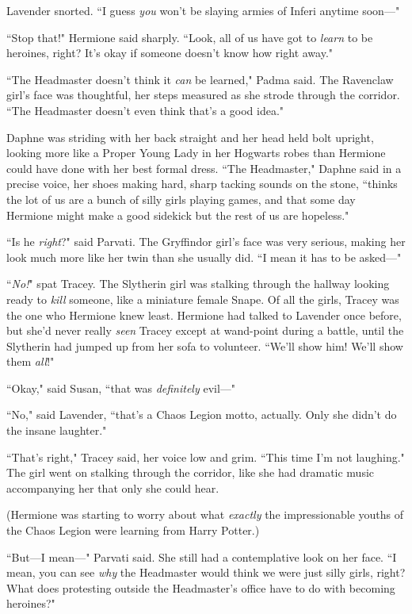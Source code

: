 Lavender snorted. ``I guess \emph{you} won't be slaying armies of Inferi anytime soon—"

``Stop that!" Hermione said sharply. ``Look, all of us have got to \emph{learn} to be heroines, right? It's okay if someone doesn't know how right away."

``The Headmaster doesn't think it \emph{can} be learned," Padma said. The Ravenclaw girl's face was thoughtful, her steps measured as she strode through the corridor. ``The Headmaster doesn't even think that's a good idea."

Daphne was striding with her back straight and her head held bolt upright, looking more like a Proper Young Lady in her Hogwarts robes than Hermione could have done with her best formal dress. ``The Headmaster," Daphne said in a precise voice, her shoes making hard, sharp tacking sounds on the stone, ``thinks the lot of us are a bunch of silly girls playing games, and that some day Hermione might make a good sidekick but the rest of us are hopeless."

``Is he \emph{right}?" said Parvati. The Gryffindor girl's face was very serious, making her look much more like her twin than she usually did. ``I mean it has to be asked—"

``\emph{No!}" spat Tracey. The Slytherin girl was stalking through the hallway looking ready to \emph{kill} someone, like a miniature female Snape. Of all the girls, Tracey was the one who Hermione knew least. Hermione had talked to Lavender once before, but she'd never really \emph{seen} Tracey except at wand-point during a battle, until the Slytherin had jumped up from her sofa to volunteer. ``We'll show him! We'll show them \emph{all}!"

``Okay," said Susan, ``that was \emph{definitely} evil—"

``No," said Lavender, ``that's a Chaos Legion motto, actually. Only she didn't do the insane laughter."

``That's right," Tracey said, her voice low and grim. ``This time I'm not laughing." The girl went on stalking through the corridor, like she had dramatic music accompanying her that only she could hear.

(Hermione was starting to worry about what \emph{exactly} the impressionable youths of the Chaos Legion were learning from Harry Potter.)

``But—I mean—" Parvati said. She still had a contemplative look on her face. ``I mean, you can see \emph{why} the Headmaster would think we were just silly girls, right? What does protesting outside the Headmaster's office have to do with becoming heroines?"

